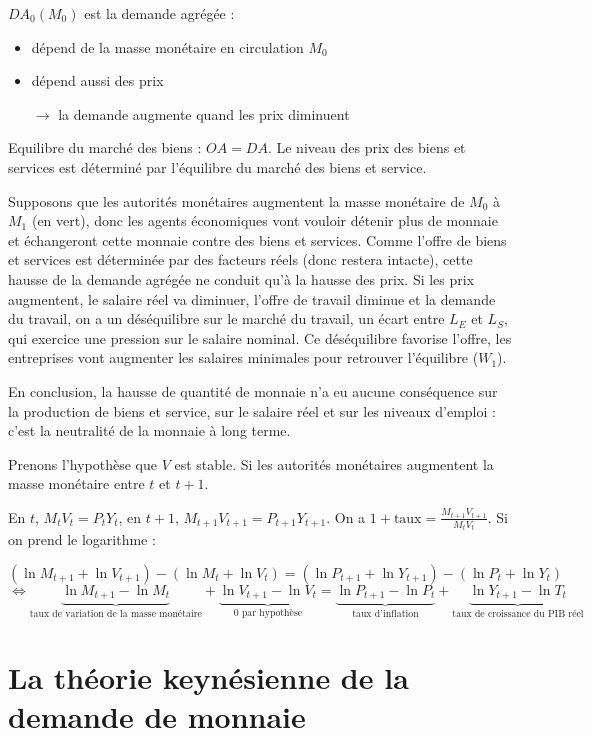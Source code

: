 	$DA_0(M_0)$ est la demande agrégée :
	
	\begin{itemize}
		\item dépend de la masse monétaire en circulation $M_0$
		\item dépend aussi des prix
		\item[$\rightarrow$] la demande augmente quand les prix diminuent
	\end{itemize}
	
	Equilibre du marché des biens : $OA = DA$. Le niveau des prix des biens et services est déterminé par l'équilibre du marché des biens et service.
	
	Supposons que les autorités monétaires augmentent la masse monétaire de $M_0$ à $M_1$ (en vert), donc les agents économiques vont vouloir détenir plus de monnaie et échangeront cette monnaie contre des biens et services. Comme l'offre de biens et services est déterminée par des facteurs réels (donc restera intacte), cette hausse de la demande agrégée ne conduit qu'à la hausse des prix. Si les prix augmentent, le salaire réel va diminuer, l'offre de travail diminue et la demande du travail, on a un déséquilibre sur le marché du travail, un écart entre $L_E$ et $L_S$, qui exercice une pression sur le salaire nominal. Ce déséquilibre favorise l'offre, les entreprises vont augmenter les salaires minimales pour retrouver l'équilibre ($W_1$).
	
	En conclusion, la hausse de quantité de monnaie n'a eu aucune conséquence sur la production de biens et service, sur le salaire réel et sur les niveaux d'emploi : c'est la neutralité de la monnaie à long terme.
	
	
	Prenons l'hypothèse que $V$ est stable. Si les autorités monétaires augmentent la masse monétaire entre $t$ et $t + 1$.
	
	En $t$, $M_t V_t = P_t Y_t$, en $t + 1$, $M_{t + 1} V_{t + 1} = P_{t + 1} Y_{t + 1}$. On a $1 + \text{taux} = \frac{M_{t + 1} V_{t + 1}}{M_t V_t}$. Si on prend le logarithme :
	
	$$(\ln M_{t + 1} + \ln V_{t + 1}) - (\ln M_t + \ln V_t) = (\ln P_{t + 1} + \ln Y_{t + 1}) - (\ln P_t + \ln Y_t)$$
	$$\Leftrightarrow \underbrace{\ln M_{t + 1} - \ln M_t}_{\text{taux de variation de la masse monétaire}} + \underbrace{\ln V_{t + 1} - \ln V_t}_{0\text{ par hypothèse}} = \underbrace{\ln P_{t + 1} -\ln P_t}_{\text{taux d'inflation}} + \underbrace{\ln Y_{t + 1} - \ln T_t}_{\text{taux de croissance du PIB réel}}$$
	
\section{La théorie keynésienne de la demande de monnaie}

	